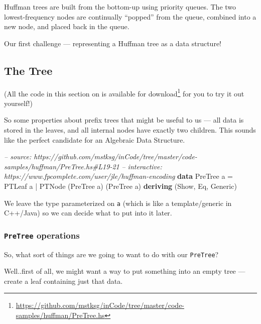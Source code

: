 \documentclass[]{article}
\newenvironment{Shaded}{}{}
\newcommand{\KeywordTok}[1]{\textcolor[rgb]{0.00,0.44,0.13}{\textbf{{#1}}}}
\newcommand{\DataTypeTok}[1]{\textcolor[rgb]{0.56,0.13,0.00}{{#1}}}
\newcommand{\CommentTok}[1]{\textcolor[rgb]{0.38,0.63,0.69}{\textit{{#1}}}}
\newcommand{\FunctionTok}[1]{\textcolor[rgb]{0.02,0.16,0.49}{{#1}}}
\newcommand{\NormalTok}[1]{{#1}}
\renewcommand{\href}[2]{#2\footnote{\url{#1}}}
\begin{document}
Huffman trees are built from the bottom-up using priority queues. The two
lowest-frequency nodes are continually ``popped'' from the queue, combined into
a new node, and placed back in the queue.

Our first challenge --- representing a Huffman tree as a data structure!

\subsection{The Tree}\label{the-tree}

(All the code in this section on is
\href{https://github.com/mstksg/inCode/tree/master/code-samples/huffman/PreTree.hs}{available
for download} for you to try it out yourself!)

So some properties about prefix trees that might be useful to us --- all data is
stored in the leaves, and all internal nodes have exactly two children. This
sounds like the perfect candidate for an Algebraic Data Structure.

\begin{Shaded}
\begin{Highlighting}[]
\CommentTok{-- source: https://github.com/mstksg/inCode/tree/master/code-samples/huffman/PreTree.hs#L19-21}
\CommentTok{-- interactive: https://www.fpcomplete.com/user/jle/huffman-encoding}
\KeywordTok{data} \DataTypeTok{PreTree} \NormalTok{a }\FunctionTok{=} \DataTypeTok{PTLeaf} \NormalTok{a}
               \FunctionTok{|} \DataTypeTok{PTNode} \NormalTok{(}\DataTypeTok{PreTree} \NormalTok{a) (}\DataTypeTok{PreTree} \NormalTok{a)}
               \KeywordTok{deriving} \NormalTok{(}\DataTypeTok{Show}\NormalTok{, }\DataTypeTok{Eq}\NormalTok{, }\DataTypeTok{Generic}\NormalTok{)}
\end{Highlighting}
\end{Shaded}

We leave the type parameterized on \texttt{a} (which is like a template/generic
in C++/Java) so we can decide what to put into it later.

\subsubsection{\texorpdfstring{\texttt{PreTree}
operations}{PreTree operations}}\label{pretree-operations}

So, what sort of things are we going to want to do with our \texttt{PreTree}?

Well..first of all, we might want a way to put something into an empty tree ---
create a leaf containing just that data.
\end{document}
